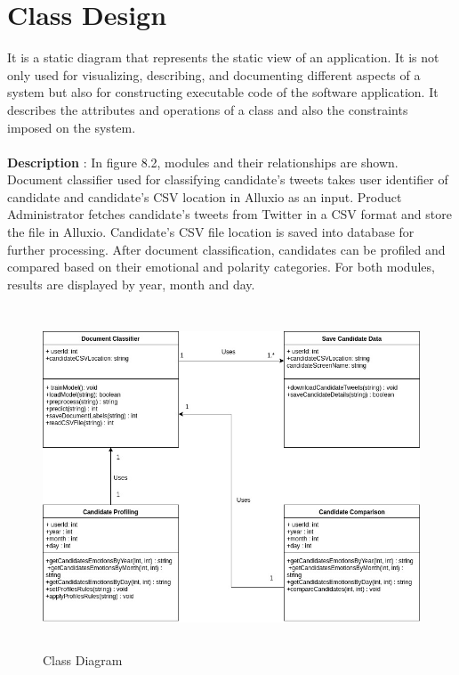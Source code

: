 \documentclass[oneside,a4paper,12pt]{pictreport}
\begin{document}
\section{Class Design}
It is a static diagram that represents the static view of an application. It is not only used for visualizing, describing, and documenting different aspects of a system but also for constructing executable code of the software application. It describes the attributes and operations of a class and also the constraints imposed on the system.\\\\
\textbf{Description} : In figure 8.2, modules and their relationships are shown. Document classifier used for classifying candidate's tweets takes user identifier of candidate and candidate's CSV location in Alluxio as an input. Product Administrator fetches candidate's tweets from Twitter in a CSV format and store the file in Alluxio. Candidate's CSV file location is saved into database for further processing. After document classification, candidates can be profiled and compared based on their emotional and polarity categories. For both modules, results are displayed by year, month and day.
\begin{figure}[h!]
\includegraphics[width=4.5in,height=4.0in]{Class.jpg}
\caption{Class Diagram}
\end{figure}
\newpage
\end{document}
